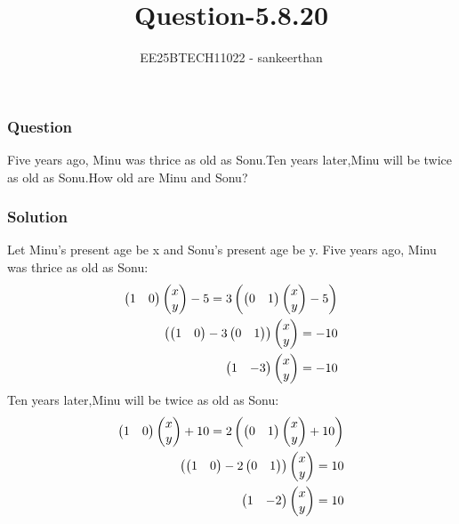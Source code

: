 \documentclass{beamer}
\title{Question-5.8.20}
\author{EE25BTECH11022 - sankeerthan}
\date{}
\begin{document}
\frame{\titlepage}

\begin{frame}
\frametitle{Question}
Five years ago, Minu was thrice as old as Sonu.Ten years later,Minu will be twice as old as Sonu.How old are Minu and Sonu?
\end{frame}

\begin{frame}
\frametitle{Solution}
Let Minu's present age be x and Sonu's present age be y.
Five years ago, Minu was thrice as old as Sonu:
\begin{align}
\begin{pmatrix}1 & 0\end{pmatrix}\begin{pmatrix}x \\ y\end{pmatrix}-5 = 3\left(\begin{pmatrix}0 & 1\end{pmatrix}\begin{pmatrix}x \\ y\end{pmatrix}-5\right) \\
\left(\begin{pmatrix}1 & 0\end{pmatrix}-3\begin{pmatrix}0 & 1\end{pmatrix}\right)\begin{pmatrix}x \\ y\end{pmatrix}= -10 \\ 
\begin{pmatrix}1 & -3\end{pmatrix}\begin{pmatrix}x \\ y\end{pmatrix}= -10 
\end{align}
Ten years later,Minu will be twice as old as Sonu:
\begin{align}
\begin{pmatrix}1 & 0\end{pmatrix}\begin{pmatrix}x \\ y\end{pmatrix}+10= 2\left(\begin{pmatrix}0 & 1\end{pmatrix}\begin{pmatrix}x \\ y\end{pmatrix}+10\right) \\
\left(\begin{pmatrix}1 & 0\end{pmatrix}-2\begin{pmatrix}0 & 1\end{pmatrix}\right)\begin{pmatrix}x \\ y\end{pmatrix}= 10 \\
\begin{pmatrix}1 & -2\end{pmatrix}\begin{pmatrix}x \\ y\end{pmatrix}= 10 
\end{align}
\end{frame}
\end{document}
